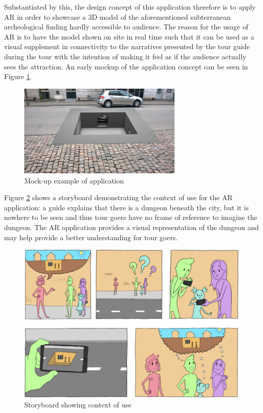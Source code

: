 Substantiated by this, the design concept of this application therefore is to apply AR in order to showcase a 3D model of the aforementioned subterranean archeological finding hardly accessible to audience. The reason for the usage of AR is to have the model shown on site in real time such that it can be used as a visual supplement in connectivity to the narratives presented by the tour guide during the tour with the intention of making it feel as if the audience actually sees the attraction. An early mockup of the application concept can be seen in Figure \ref{fig:mockup}.

\begin{figure}[h!]
   \centering
   \includegraphics[width=0.7\textwidth]{figures/mockup.png}
   \caption{Mock-up example of application}\label{fig:mockup}
\end{figure}

Figure \ref{fig:storyboard} shows a storyboard demonstrating the context of use for the AR application: a guide explains that there is a dungeon beneath the city, but it is nowhere to be seen and thus tour goers have no frame of reference to imagine the dungeon. The AR application provides a visual representation of the dungeon and may help provide a better understanding for tour goers.

\begin{figure}[h!]
   \centering
   \includegraphics[width=\textwidth]{figures/storyboard.jpg}
   \caption{Storyboard showing context of use}\label{fig:storyboard}
\end{figure}

